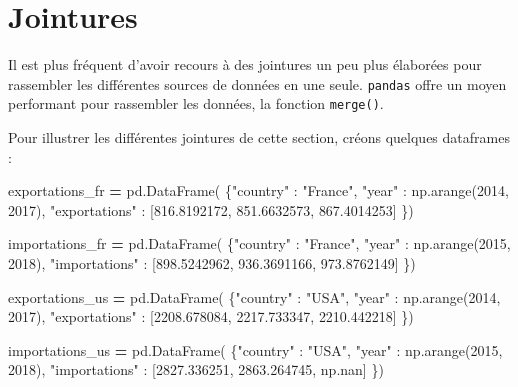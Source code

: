 \documentclass[12pt,]{book}
\newenvironment{Shaded}{\begin{snugshade}}{\end{snugshade}}
\newcommand{\DecValTok}[1]{\textcolor[rgb]{0.00,0.00,0.81}{#1}}
\newcommand{\FloatTok}[1]{\textcolor[rgb]{0.00,0.00,0.81}{#1}}
\newcommand{\StringTok}[1]{\textcolor[rgb]{0.31,0.60,0.02}{#1}}
\newcommand{\OperatorTok}[1]{\textcolor[rgb]{0.81,0.36,0.00}{\textbf{#1}}}
\newcommand{\NormalTok}[1]{#1}
\numberwithin{equation}{section}
\numberwithin{countremarque}{section}
\begin{document}
\section{Jointures}\label{pandas-jointures}

Il est plus fréquent d'avoir recours à des jointures un peu plus
élaborées pour rassembler les différentes sources de données en une
seule. \texttt{pandas} offre un moyen performant pour rassembler les
données, la fonction \texttt{merge()}.

Pour illustrer les différentes jointures de cette section, créons
quelques dataframes :

\begin{Shaded}
\begin{Highlighting}[]
\NormalTok{exportations_fr }\OperatorTok{=}\NormalTok{ pd.DataFrame(}
\NormalTok{    \{}\StringTok{"country"}\NormalTok{ : }\StringTok{"France"}\NormalTok{,}
     \StringTok{"year"}\NormalTok{ : np.arange(}\DecValTok{2014}\NormalTok{, }\DecValTok{2017}\NormalTok{),}
     \StringTok{"exportations"}\NormalTok{ : [}\FloatTok{816.8192172}\NormalTok{, }\FloatTok{851.6632573}\NormalTok{, }\FloatTok{867.4014253}\NormalTok{]}
\NormalTok{    \})}

\NormalTok{importations_fr }\OperatorTok{=}\NormalTok{ pd.DataFrame(}
\NormalTok{    \{}\StringTok{"country"}\NormalTok{ : }\StringTok{"France"}\NormalTok{,}
     \StringTok{"year"}\NormalTok{ : np.arange(}\DecValTok{2015}\NormalTok{, }\DecValTok{2018}\NormalTok{),}
     \StringTok{"importations"}\NormalTok{ : [}\FloatTok{898.5242962}\NormalTok{, }\FloatTok{936.3691166}\NormalTok{, }\FloatTok{973.8762149}\NormalTok{]}
\NormalTok{    \})}

\NormalTok{exportations_us }\OperatorTok{=}\NormalTok{ pd.DataFrame(}
\NormalTok{    \{}\StringTok{"country"}\NormalTok{ : }\StringTok{"USA"}\NormalTok{,}
     \StringTok{"year"}\NormalTok{ : np.arange(}\DecValTok{2014}\NormalTok{, }\DecValTok{2017}\NormalTok{),}
     \StringTok{"exportations"}\NormalTok{ : [}\FloatTok{2208.678084}\NormalTok{, }\FloatTok{2217.733347}\NormalTok{, }\FloatTok{2210.442218}\NormalTok{]}
\NormalTok{    \})}

\NormalTok{importations_us }\OperatorTok{=}\NormalTok{ pd.DataFrame(}
\NormalTok{    \{}\StringTok{"country"}\NormalTok{ : }\StringTok{"USA"}\NormalTok{,}
     \StringTok{"year"}\NormalTok{ : np.arange(}\DecValTok{2015}\NormalTok{, }\DecValTok{2018}\NormalTok{),}
     \StringTok{"importations"}\NormalTok{ : [}\FloatTok{2827.336251}\NormalTok{, }\FloatTok{2863.264745}\NormalTok{, np.nan]}
\NormalTok{    \})}


\end{Highlighting}
\end{Shaded}
\end{document}
